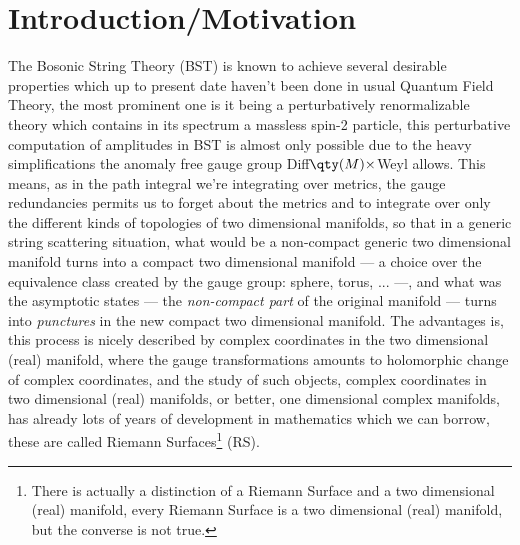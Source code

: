 \section{Introduction/Motivation}
\label{sec:intro}

The Bosonic String Theory (BST) is known to achieve several desirable properties which up to present date 
haven't been done in usual Quantum Field Theory, the most prominent one is it being a perturbatively 
renormalizable theory which contains in its spectrum a massless spin-2 particle, this 
perturbative computation of amplitudes in BST is almost only possible 
due to the heavy simplifications the 
anomaly free gauge group Diff$\qty(M)\times$Weyl allows\cite{polchinski:vol1}. This means, as in the path integral we're 
integrating over metrics, the gauge redundancies permits us to forget about the metrics and to integrate 
over only the different kinds of topologies of two dimensional manifolds, so that in a generic string 
scattering situation, what would be a non-compact generic two dimensional manifold turns into a 
compact two dimensional manifold --- a choice over the equivalence class created by the gauge group: 
sphere, torus, ... ---, and what was the asymptotic states --- the \textit{non-compact part} of the original 
manifold --- turns into \textit{punctures} in the new compact two dimensional manifold. The advantages is, 
this process is nicely described by complex coordinates in the two dimensional (real) manifold, where the 
gauge transformations amounts to holomorphic change of complex coordinates, and the study of such objects, 
complex coordinates in two dimensional (real) manifolds, or better, one dimensional complex manifolds, 
has already lots of years of development in mathematics which we can borrow, these are called Riemann 
Surfaces\footnote{There is actually a distinction of a Riemann Surface and a two dimensional (real) manifold, every 
Riemann Surface is a two dimensional (real) manifold, but the converse is not true.} (RS).

